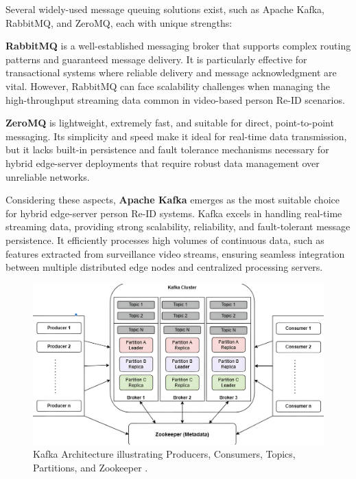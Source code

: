 \documentclass[../main.tex]{subfiles}
\begin{document}
Several widely-used message queuing solutions exist, such as Apache Kafka, RabbitMQ, and ZeroMQ, each with unique strengths:

\textbf{RabbitMQ} \cite{rabbitmq_intro} is a well-established messaging broker that supports complex routing patterns and guaranteed message delivery. It is particularly effective for transactional systems where reliable delivery and message acknowledgment are vital. However, RabbitMQ can face scalability challenges when managing the high-throughput streaming data common in video-based person Re-ID scenarios.

\textbf{ZeroMQ} \cite{zeromq_intro} is lightweight, extremely fast, and suitable for direct, point-to-point messaging. Its simplicity and speed make it ideal for real-time data transmission, but it lacks built-in persistence and fault tolerance mechanisms necessary for hybrid edge-server deployments that require robust data management over unreliable networks.

Considering these aspects, \textbf{Apache Kafka} \cite{kafka_intro} emerges as the most suitable choice for hybrid edge-server person Re-ID systems. Kafka excels in handling real-time streaming data, providing strong scalability, reliability, and fault-tolerant message persistence. It efficiently processes high volumes of continuous data, such as features extracted from surveillance video streams, ensuring seamless integration between multiple distributed edge nodes and centralized processing servers.

\begin{figure}[htbp]
    \centering
    \includegraphics[width=1\textwidth]{Figure/kafka-fig.png}
    \caption{Kafka Architecture illustrating Producers, Consumers, Topics, Partitions, and Zookeeper \cite{whatiskafka}.}
    \label{fig:kafka_architecture}
\end{figure}
\end{document}
